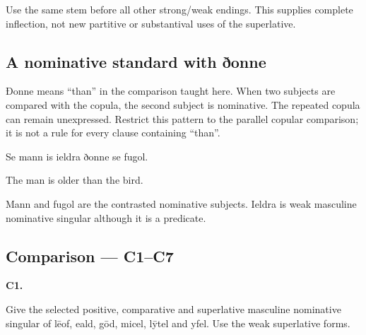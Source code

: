 Use the same stem before all other strong/\allowbreak{}weak endings. This supplies complete inflection, not new partitive or substantival uses of the superlative.

\subsection*{A nominative standard with ðonne}

Ðonne means “than” in the comparison taught here. When two subjects are compared with the copula, the second subject is nominative. The repeated copula can remain unexpressed. Restrict this pattern to the parallel copular comparison; it is not a rule for every clause containing “than”.

Se mann is ieldra ðonne se fugol.

The man is older than the bird.

Mann and fugol are the contrasted nominative subjects. Ieldra is weak masculine nominative singular although it is a predicate.

\subsection*{Comparison — C1–C7}

\par\begin{minipage}{\linewidth}\raggedright
\textbf{C1.}

Give the selected positive, comparative and superlative masculine nominative singular of lēof, eald, gōd, micel, lȳtel and yfel. Use the weak superlative forms.

\end{minipage}\par\addvspace{4pt}

